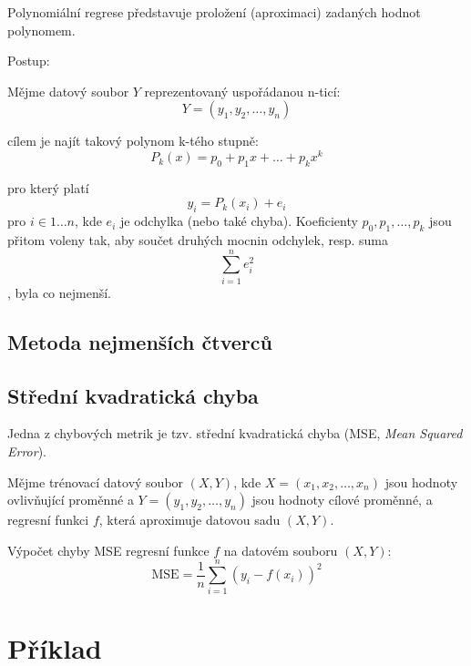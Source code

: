 \begin{compactitem}
    \item Polynomiální regrese představuje proložení (aproximaci) zadaných hodnot polynomem.

    \item Postup: \begin{compactitem}
        \item Mějme datový soubor $Y$ reprezentovaný uspořádanou n-ticí: $$Y = (y_1, y_2, \ldots, y_n)$$
        \item cílem je najít takový polynom k-tého stupně:
        $$P_k(x) = p_0 + p_1 x + \ldots + p_k x^k$$
        \item pro který platí
        $$y_i = P_k(x_i) + e_i$$
        pro $i \in 1 \ldots n$, kde $e_i$ je odchylka (nebo také chyba). Koeficienty $p_0, p_1, \ldots, p_k$ jsou přitom voleny tak, aby součet druhých mocnin odchylek, resp. suma $$\sum_{i=1}^n e_i^2$$, byla co nejmenší.
    \end{compactitem}
\end{compactitem}

\subsection{Metoda nejmenších čtverců}


\subsection{Střední kvadratická chyba}

\begin{compactitem}
    \item Jedna z chybových metrik je tzv. střední kvadratická chyba (MSE, \textit{Mean Squared Error}).

    \item Mějme trénovací datový soubor $(X, Y)$, kde $X = (x_1, x_2, \ldots, x_n)$ jsou hodnoty ovlivňující proměnné a $Y = (y_1, y_2, \ldots, y_n)$ jsou hodnoty cílové proměnné, a regresní funkci $f$, která aproximuje datovou sadu $(X, Y)$.

    \item Výpočet chyby MSE regresní funkce $f$ na datovém souboru $(X, Y)$:
    $$ \text{MSE} = \frac{1}{n} \sum_{i=1}^n (y_i - f(x_i))^2 $$
\end{compactitem}



\section{Příklad}
